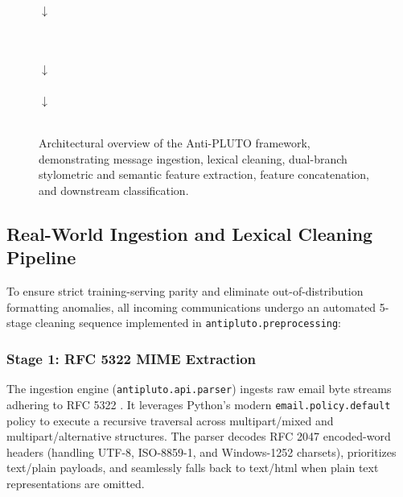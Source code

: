 \documentclass[journal]{IEEEtran}
\begin{document}
\begin{figure}[!t]
{\begin{minipage}{0.96\textwidth}
\begin{minipage}{0.47\textwidth}\centering $\boldsymbol{\downarrow}$\end{minipage}\\[0.15cm]
\\[0.15cm]
$\boldsymbol{\downarrow}$\\[0.15cm]
\\[0.15cm]
$\boldsymbol{\downarrow}$\\[0.15cm]
\\[0.2cm]
\end{minipage}%
}
\caption{Architectural overview of the Anti-PLUTO framework, demonstrating message ingestion, lexical cleaning, dual-branch stylometric and semantic feature extraction, feature concatenation, and downstream classification.}
\label{fig:architecture_pipeline}
\end{figure}

\subsection{Real-World Ingestion and Lexical Cleaning Pipeline}
To ensure strict training-serving parity and eliminate out-of-distribution formatting anomalies, all incoming communications undergo an automated 5-stage cleaning sequence implemented in \texttt{antipluto.preprocessing}:

\subsubsection{Stage 1: RFC 5322 MIME Extraction}
The ingestion engine (\texttt{antipluto.api.parser}) ingests raw email byte streams adhering to RFC 5322 \cite{resnick2008rfc5322}. It leverages Python's modern \texttt{email.policy.default} policy to execute a recursive traversal across multipart/mixed and multipart/alternative structures. The parser decodes RFC 2047 encoded-word headers (handling UTF-8, ISO-8859-1, and Windows-1252 charsets), prioritizes text/plain payloads, and seamlessly falls back to text/html when plain text representations are omitted.
\end{document}
